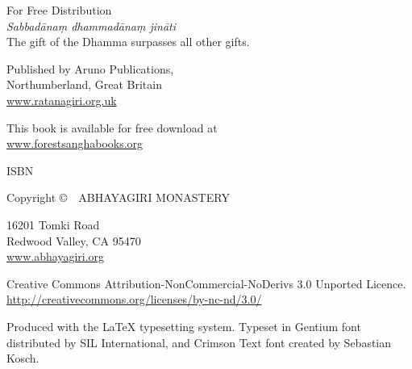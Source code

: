 
\enlargethispage{2\onelineskip}

{\footnotesize\setlength{\parskip}{0.8em}\setlength{\parindent}{0em}%
{\raggedright%

\thetitle

For Free Distribution\\
\emph{Sabbadānaṃ dhammadānaṃ jināti}\\
The gift of the Dhamma surpasses all other gifts.

Published by Aruno Publications,\\
Northumberland, Great Britain\\
\href{http://ratanagiri.org.uk/}{www.ratanagiri.org.uk}

This book is available for free download at\\
\href{http://forestsanghabooks.org/}{www.forestsanghabooks.org}

ISBN \theISBN

Copyright \copyright\ \the\year\ ABHAYAGIRI MONASTERY

16201 Tomki Road\\
Redwood Valley, CA 95470\\
\href{http://abhayagiri.org/}{www.abhayagiri.org}

\vfill

{\tiny

Creative Commons Attribution-NonCommercial-NoDerivs 3.0 Unported Licence.\\
\href{http://creativecommons.org/licenses/by-nc-nd/3.0/}{http://creativecommons.org/licenses/by-nc-nd/3.0/}


Produced with the {\selectfont\LaTeX} typesetting system. Typeset in Gentium font distributed by SIL International, and Crimson Text font created by Sebastian Kosch.

\theEditionInfo

}

}}

